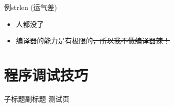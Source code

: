 \documentclass[10pt,mathserif]{beamer}
\newcommand{\lstterm}[1] {  }
\begin{document}
\begin{frame}[fragile]{例}{strlen (运气差)}
	\lstterm{strlen-2.out}
	\begin{itemize}
		\item 人都没了
		\item 编译器的能力是有极限的\sout{，所以我不做编译器辣！}
	\end{itemize}
\end{frame}

\section{程序调试技巧}
\sectionpage

\begin{frame}{子标题}{副标题}
	测试页
\end{frame}

{\xdbg%
\begin{frame}
\end{frame}}
\end{document}

